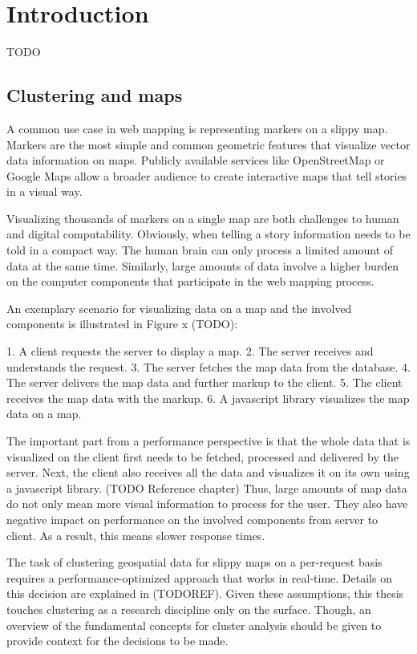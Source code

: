 
%
%

\chapter{Introduction}

TODO


\section{Clustering and maps}

A common use case in web mapping is representing markers on a slippy map. Markers are the most simple and common geometric features that visualize vector data information on maps. Publicly available services like OpenStreetMap or Google Maps allow a broader audience to create interactive maps that tell stories in a visual way.

Visualizing thousands of markers on a single map are both challenges to human and digital computability. Obviously, when telling a story information needs to be told in a compact way. The human brain can only process a limited amount of data at the same time. Similarly, large amounts of data involve a higher burden on the computer components that participate in the web mapping process.

An exemplary scenario for visualizing data on a map and the involved components is illustrated in Figure x (TODO):

1. A client requests the server to display a map.
2. The server receives and understands the request.
3. The server fetches the map data from the database.
4. The server delivers the map data and further markup to the client.
5. The client receives the map data with the markup.
6. A javascript library visualizes the map data on a map.

The important part from a performance perspective is that the whole data that is visualized on the client first needs to be fetched, processed and delivered by the server. Next, the client also receives all the data and visualizes it on its own using a javascript library. (TODO Reference chapter) Thus, large amounts of map data do not only mean more visual information to process for the user. They also have negative impact on performance on the involved components from server to client. As a result, this means slower response times. 

The task of clustering geospatial data for slippy maps on a per-request basis requires a performance-optimized approach that works in real-time. Details on this decision are explained in (TODOREF). Given these assumptions, this thesis touches clustering as a research discipline only on the surface. Though, an overview of the fundamental concepts for cluster analysis should be given to provide context for the decisions to be made.